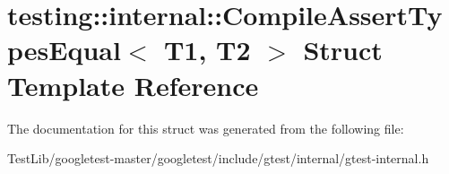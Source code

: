 \hypertarget{structtesting_1_1internal_1_1CompileAssertTypesEqual}{}\section{testing\+:\+:internal\+:\+:Compile\+Assert\+Types\+Equal$<$ T1, T2 $>$ Struct Template Reference}
\label{structtesting_1_1internal_1_1CompileAssertTypesEqual}


The documentation for this struct was generated from the following file\+:\begin{DoxyCompactItemize}
\item 
Test\+Lib/googletest-\/master/googletest/include/gtest/internal/gtest-\/internal.\+h\end{DoxyCompactItemize}
